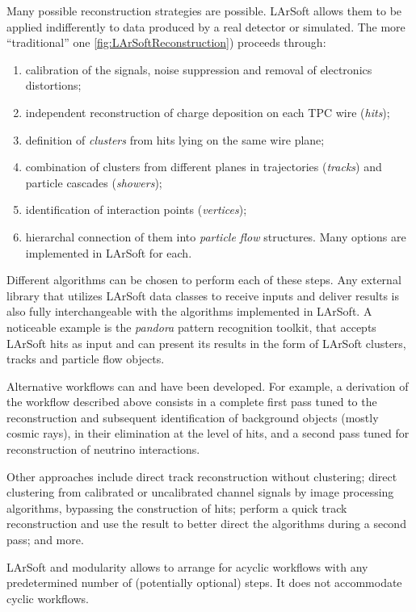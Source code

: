 Many possible reconstruction strategies are possible.
LArSoft allows them to be applied indifferently to data produced by a real detector or simulated.
The more ``traditional'' one \cref{fig:LArSoftReconstruction}) proceeds through:
\begin{enumerate}
  \item calibration of the signals, noise suppression and removal of electronics distortions;
  \item independent reconstruction of charge deposition on each TPC wire (\emph{hits});
  \item definition of \emph{clusters} from hits lying on the same wire plane;
  \item combination of clusters from different planes in trajectories (\emph{tracks}) and particle cascades (\emph{showers});
  \item identification of interaction points (\emph{vertices});
  \item hierarchal connection of them into \emph{particle flow} structures. Many options are implemented in LArSoft for each.
\end{enumerate}
Different algorithms can be chosen to perform each of these steps.
Any external library that utilizes LArSoft data classes to receive inputs
and deliver results is also fully interchangeable with the algorithms implemented in LArSoft.
A noticeable example is the \emph{pandora} pattern recognition toolkit,
that accepts LArSoft hits as input and can present its results in the form of LArSoft clusters,
tracks and particle flow objects.

Alternative workflows can and have been developed.
For example, a derivation of the workflow described above consists in a complete
first pass tuned to the reconstruction and subsequent identification of background
objects (mostly cosmic rays), in their elimination at the level of hits,
and a second pass tuned for reconstruction of neutrino interactions.

Other approaches include direct track reconstruction without clustering;
direct clustering from calibrated or uncalibrated channel signals by image processing algorithms,
bypassing the construction of hits;
perform a quick track reconstruction
and use the result to better direct the algorithms during a second pass;
and more.

LArSoft and \ART modularity allows to arrange for acyclic workflows
with any predetermined number of (potentially optional) steps.
It does not accommodate cyclic workflows.


